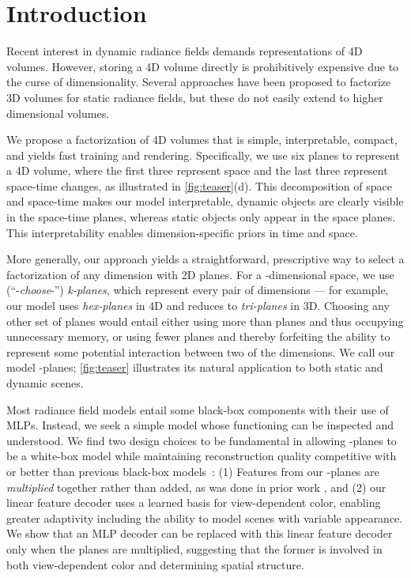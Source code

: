 \documentclass[10pt,twocolumn,letterpaper]{article}
\newcommand{\modelname}{-planes}
\begin{document}
\vspace{-10pt}

\section{Introduction}\label{sec:intro}

Recent interest in dynamic radiance fields demands representations of 4D volumes. However, storing a 4D volume directly is prohibitively expensive due to the curse of dimensionality. Several approaches have been proposed to factorize 3D volumes for static radiance fields, but these do not easily extend to higher dimensional volumes.

We propose a factorization of 4D volumes that is simple, interpretable, compact, and yields fast training and rendering. Specifically, we use six planes to represent a 4D volume, where the first three represent space and the last three represent space-time changes, as illustrated in \cref{fig:teaser}(d). This decomposition of space and space-time makes our model interpretable, \ie dynamic objects are clearly visible in the space-time planes, whereas static objects only appear in the space planes. 
This interpretability enables dimension-specific priors in time and space.

More generally, our approach yields a straightforward, prescriptive way to select a factorization of any dimension with 2D planes.
For a -dimensional space, we use  (``-\textit{choose}-'') \emph{k-planes}, which represent every pair of dimensions --- for example, our model uses  \emph{hex-planes} in 4D and reduces to  \emph{tri-planes} in 3D. Choosing any other set of planes would entail either using more than  planes and thus occupying unnecessary memory, or using fewer planes and thereby forfeiting the ability to represent some potential interaction between two of the  dimensions. We call our model \modelname{}; \cref{fig:teaser} illustrates its natural application to both static and dynamic scenes.

Most radiance field models entail some black-box components with their use of MLPs. 
Instead, we seek a simple model whose functioning can be inspected and understood. 
We find two design choices to be fundamental in allowing \modelname{} to be a white-box model while maintaining reconstruction quality competitive with or better than previous black-box models~\cite{dynerf, dnerf}:
(1) Features from our \modelname{} are \emph{multiplied} together rather than added, as was done in prior work \cite{triplane, tensorf}, and (2) our linear feature decoder uses a learned basis for view-dependent color, enabling greater adaptivity including the ability to model scenes with variable appearance. We show that an MLP decoder can be replaced with this linear feature decoder only when the planes are multiplied, suggesting that the former is involved in both view-dependent color and determining spatial structure.
\end{document}
